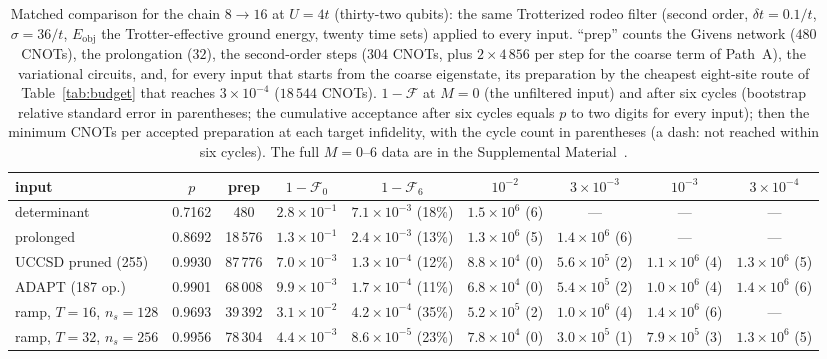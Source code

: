 \documentclass[a4paper,11pt,noarxiv]{quantumarticle}
\newcommand{\Eobj}{E_{\mathrm{obj}}}
\newcommand{\SM}{Supplemental Material~\cite{SM}}
\begin{document}
\begin{table}[t]
  \caption{Matched comparison for the chain $8\to16$ at $U=4t$ (thirty-two
  qubits): the same Trotterized rodeo filter (second order,
  $\delta t=0.1/t$, $\sigma=36/t$, $\Eobj$ the Trotter-effective ground
  energy, twenty time sets) applied to every input.  ``prep'' counts the
  Givens network ($480$ CNOTs), the prolongation ($32$), the second-order
  steps ($304$ CNOTs, plus $2\times4\,856$ per step for the coarse term of
  Path~A), the variational circuits, and, for every input that starts from
  the coarse eigenstate, its preparation by the cheapest eight-site route
  of Table~\ref{tab:budget} that reaches $3\times10^{-4}$ ($18\,544$ CNOTs).
  $1-\mathcal F$ at $M=0$ (the unfiltered input) and after six cycles
  (bootstrap relative standard error in parentheses; the cumulative
  acceptance after six cycles equals $p$ to two digits for every input);
  then the minimum CNOTs per accepted preparation at each
  target infidelity, with the cycle count in parentheses (a dash: not
  reached within six cycles).  The full $M=0$--$6$ data are in the \SM.}
  \label{tab:large}
  \centering\scriptsize
  \setlength{\tabcolsep}{2pt}
  \begin{tabular}{lcc|cc|cccc}
  \toprule
  input & $p$ & prep & $1-\mathcal F_0$ & $1-\mathcal F_6$ & $10^{-2}$ & $3{\times}10^{-3}$ & $10^{-3}$ & $3{\times}10^{-4}$\\
  \midrule
  determinant & 0.7162 & 480 & $2.8{\times}10^{-1}$ & $7.1{\times}10^{-3}$ (18\%) & $1.5{\times}10^{6}$ (6) & --- & --- & ---\\
  prolonged & 0.8692 & 18\,576 & $1.3{\times}10^{-1}$ & $2.4{\times}10^{-3}$ (13\%) & $1.3{\times}10^{6}$ (5) & $1.4{\times}10^{6}$ (6) & --- & ---\\
  UCCSD pruned (255) & 0.9930 & 87\,776 & $7.0{\times}10^{-3}$ & $1.3{\times}10^{-4}$ (12\%) & $8.8{\times}10^{4}$ (0) & $5.6{\times}10^{5}$ (2) & $1.1{\times}10^{6}$ (4) & $1.3{\times}10^{6}$ (5)\\
  ADAPT (187 op.) & 0.9901 & 68\,008 & $9.9{\times}10^{-3}$ & $1.7{\times}10^{-4}$ (11\%) & $6.8{\times}10^{4}$ (0) & $5.4{\times}10^{5}$ (2) & $1.0{\times}10^{6}$ (4) & $1.4{\times}10^{6}$ (6)\\
  ramp, $T{=}16$, $n_s{=}128$ & 0.9693 & 39\,392 & $3.1{\times}10^{-2}$ & $4.2{\times}10^{-4}$ (35\%) & $5.2{\times}10^{5}$ (2) & $1.0{\times}10^{6}$ (4) & $1.4{\times}10^{6}$ (6) & ---\\
  ramp, $T{=}32$, $n_s{=}256$ & 0.9956 & 78\,304 & $4.4{\times}10^{-3}$ & $8.6{\times}10^{-5}$ (23\%) & $7.8{\times}10^{4}$ (0) & $3.0{\times}10^{5}$ (1) & $7.9{\times}10^{5}$ (3) & $1.3{\times}10^{6}$ (5)\\

\end{tabular}
\end{table}
\end{document}
